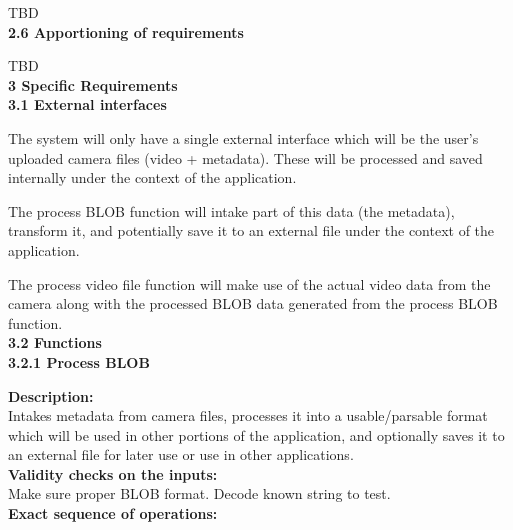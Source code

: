\documentclass[10pt,draftclsnofoot,onecolumn]{IEEEtran}
\begin{document}
        TBD\\
        			\vspace{5mm}
{\Medium\textbf{2.6 Apportioning of requirements}} \\
					\vspace{5mm}

        TBD\\
        			\vspace{5mm}
{\Large\textbf{3 Specific Requirements}}\\
\vspace{5mm}
{\Medium\textbf{3.1 External interfaces}} \\
\vspace{5mm}

The system will only have a single external interface which will be the user’s uploaded camera files (video + metadata). These will be processed and saved internally under the context of the application.\\
\vspace{2mm}


The process BLOB function will intake part of this data (the metadata), transform it, and potentially save it to an external file under the context of the application.\\
\vspace{2mm}


The process video file function will make use of the actual video data from the camera along with the processed BLOB data generated from the process BLOB function.\\

\vspace{5mm}
{\Medium\textbf{3.2 Functions}} \\
\vspace{5mm}
{\Medium\textbf{3.2.1 Process BLOB}} \\
\vspace{5mm}

 \textbf{Description:}\\
 Intakes metadata from camera files, processes it into a usable/parsable format which will be used in other portions of the application, and optionally saves it to an external file for later use or use in other applications.\\
 \vspace{2mm}
 \textbf{Validity checks on the inputs:}\\
  Make sure proper BLOB format. Decode known string to test.
\\
 \vspace{2mm}
\textbf{Exact sequence of operations: }\\\\
 \vspace{2mm}
\end{document}
